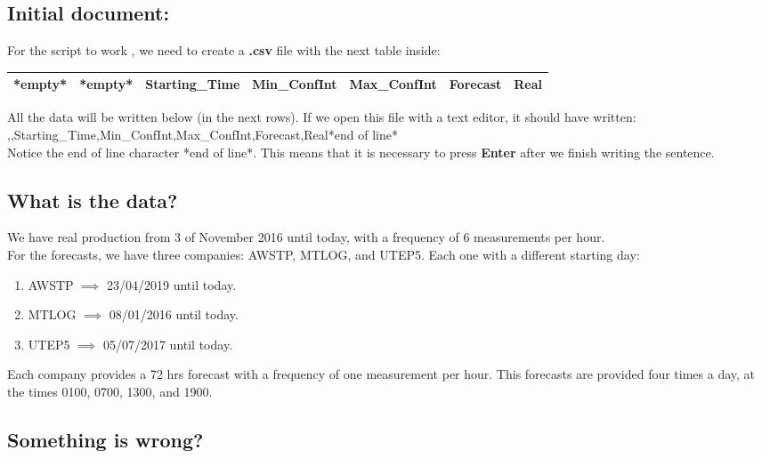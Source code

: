 \documentclass[12pt]{article}
\theoremstyle{definition}
\theoremstyle{remark}
\begin{document}
\subsection*{Initial document:}

For the script to work , we need to create a \textbf{.csv} file with the next table inside:
\begin{table}[H]
\centering
\begin{tabular}{|c|c|c|c|c|c|c|}
\toprule
{\color{red}*empty*} & {\color{red}*empty*} & Starting\_Time & Min\_ConfInt &  Max\_ConfInt & Forecast & Real \\
\midrule
\end{tabular}
\end{table}
All the data will be written below (in the next rows). If we open this file with a text editor, it should have written:\\
,,Starting\_Time,Min\_ConfInt,Max\_ConfInt,Forecast,Real{\color{red}*end of line*}\\
Notice the end of line character {\color{red}*end of line*}. This means that it is necessary to press \textbf{Enter} after we finish writing the sentence.

\subsection*{What is the data?}

We have real production from 3 of November 2016 until today, with a frequency of 6 measurements per hour.\\
For the forecasts, we have three companies: AWSTP, MTLOG, and UTEP5. Each one with a different starting day:
\begin{enumerate}

\item AWSTP $\implies$ 23/04/2019 until today.
\item MTLOG $\implies$ 08/01/2016 until today.
\item UTEP5 $\implies$ 05/07/2017 until today.

\end{enumerate}
Each company provides a 72 hrs forecast with a frequency of one measurement per hour. This forecasts are provided four times a day, at the times 0100, 0700, 1300, and 1900.

\subsection*{Something is wrong?}
\end{document}
